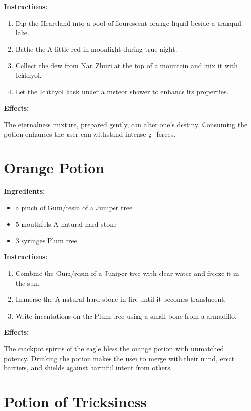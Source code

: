\documentclass{article}
\begin{document}
\textbf{Instructions:}

\begin{enumerate}
  \item Dip the Heartland into a pool of flourescent orange liquid beside a tranquil lake.
  \item Bathe the A little red in moonlight during true night.
  \item Collect the dew from Nan Zhuzi at the top of a mountain and mix it with Ichthyol.
  \item Let the Ichthyol bask under a meteor shower to enhance its properties.
\end{enumerate}

\textbf{Effects:}

The eternalness mixture, prepared gently, can alter one's destiny. Consuming the potion enhances the user can withstand intense g- forces.

\newpage
\section*{Orange Potion}

\textbf{Ingredients:}

\begin{itemize}
  \item a pinch of Gum/resin  of a Juniper tree
  \item 5 mouthfuls A natural hard stone
  \item 3 syringes Plum tree
\end{itemize}

\textbf{Instructions:}

\begin{enumerate}
  \item Combine the Gum/resin  of a Juniper tree with clear water and freeze it in the sun.
  \item Immerse the A natural hard stone in fire until it becomes translucent.
  \item Write incantations on the Plum tree using a small bone from a armadillo.
\end{enumerate}

\textbf{Effects:}

The crackpot spirits of the eagle bless the orange potion with unmatched potency. Drinking the potion makes the user to merge with their mind, erect barriers, and shields against harmful intent from others.

\newpage
\section*{Potion of Tricksiness}
\end{document}
